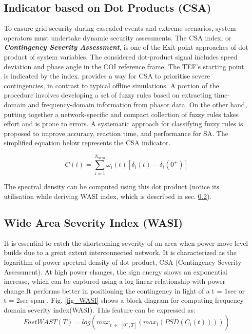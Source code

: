 \subsection{Indicator based on Dot Products (CSA)}
To ensure grid security during cascaded events and extreme scenarios, system operators must undertake dynamic security assessments. The CSA index, or \textbf{\textit{Contingency Severity Assessment}}, is one of the Exit-point approaches \cite{EPM} of dot product of system variables. The considered dot-product signal includes speed deviation and phase angle in the COI reference frame. The TEF's starting point is indicated by the index. \cite{CSA} provides a way for CSA to prioritise severe contingencies, in contrast to typical offline simulations. A portion of the procedure involves developing a set of fuzzy rules based on extracting time-domain and frequency-domain information from phasor data. On the other hand, putting together a network-specific and compact collection of fuzzy rules takes effort and is prone to errors. A systematic approach for classifying fuzzy rules is proposed \cite{CSA_WASI} to improve accuracy, reaction time, and performance for SA. The simplified equation below represents the CSA indicator.


\begin{equation}\label{CSAeqn}
C(t) = \sum_{i=1}^{N_{area}} \omega_i(t)[\delta_i(t) - \delta_i(0^+)]
\end{equation}

The spectral density can be computed using this dot product (notice its utilisation while deriving WASI index, which is described in sec. \ref{WASIsec}).

\subsection{Wide Area Severity Index (WASI)}\label{WASIsec}
It is essential to catch the shortcoming severity of an area when power move level builds due to a great extent interconnected network. It is characterized as the logarithm of  power spectral density of dot product, CSA (Contingency Severity Assessment). At high power changes, the sign energy shows an exponential increase, which can be captured using a log-linear relationship with power change.It performs better in positioning the contingency in light of a t = 1sec or t = 2sec span \cite{CSA_WASI}. Fig.  \ref{fig_WASI} shows a block diagram for computing frequency domain severity index(WASI). This feature can be expressed as:
\begin{equation}
Fast WAST(T) = log(max_{t \; \in \; [0^+,T]}(max_i(PSD(C_i(t)))))
\end{equation}

